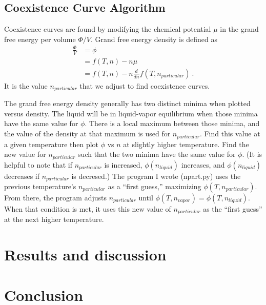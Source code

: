 \documentclass[letterpaper,twocolumn,amsmath,amssymb,prb]{revtex4-1}
\newcommand{\npart}{n_{particular}}
\newcommand{\nliq}{n_{liquid}}
\newcommand{\nvap}{n_{vapor}}
\begin{document}
\subsection{Coexistence Curve Algorithm}
Coexistence curves are found by modifying the chemical potential $\mu$
in the grand free energy per volume $\Phi/V$. Grand free energy
density is defined as
\begin{align*}
  \frac{\Phi}{V} &= \phi \\
                 &= f(T,n) - n\mu \\
                 &= f(T,n) - n\frac{d}{dn}f(T,\npart)\ .
\end{align*}
It is the value $\npart$ that we adjust to find coexistence curves.

The grand free energy density generally has two distinct minima when
plotted versus density. The liquid will be in liquid-vapor equilibrium
when those minima have the same value for $\phi$. There is a local
maximum between those minima, and the value of the density at that
maximum is used for $\npart$. Find this value at a given temperature
then plot $\phi$ vs $n$ at slightly higher temperature. Find the new
value for $\npart$ such that the two minima have the same value for
$\phi$. (It is helpful to note that if $\npart$ is increased,
$\phi(\nliq)$ increases, and $\phi(\nliq)$ decreases if $\npart$ is
decresed.) The program I wrote (npart.py) uses the previous
temperature's $\npart$ as a ``first guess,'' maximizing
$\phi(T,\npart)$. From there, the program adjusts $\npart$
until $\phi(T,\nvap) = \phi(T,\nliq)$. When that condition is met, it
uses this new value of $\npart$ as the ``first guess'' at the next
higher temperature.

\section{Results and discussion}



\section{Conclusion}


\end{document}
